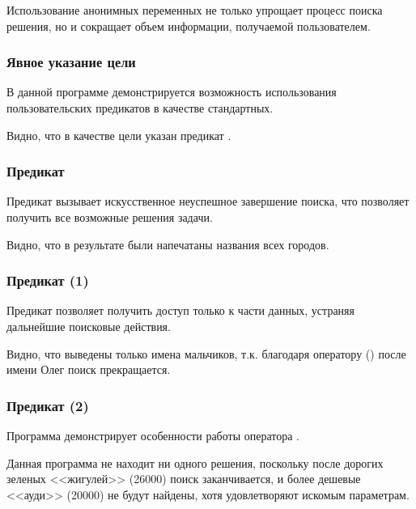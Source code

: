 
Использование анонимных переменных не только упрощает процесс поиска решения, но и сокращает объем информации, получаемой пользователем.

\subsubsection{Явное указание цели}

В данной программе демонстрируется возможность использования пользовательских предикатов в качестве стандартных.


Видно, что в качестве цели указан предикат .

\subsubsection{Предикат }

Предикат  вызывает искусственное неуспешное завершение поиска, что позволяет получить все возможные решения задачи.


Видно, что в результате были напечатаны названия всех городов.

\subsubsection{Предикат  (1)}

Предикат  позволяет получить доступ только к части данных, устраняя дальнейшие поисковые действия.


Видно, что выведены только имена мальчиков, т.к. благодаря оператору  (\code{!}) после имени Олег поиск прекращается.

\subsubsection{Предикат  (2)}

Программа демонстрирует особенности работы оператора .


Данная программа не находит ни одного решения, поскольку после дорогих зеленых <<жигулей>> (26000) поиск заканчивается, и более дешевые <<ауди>> (20000) не будут найдены, хотя удовлетворяют искомым параметрам.

